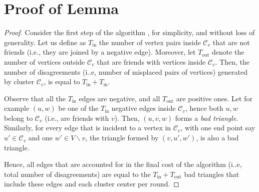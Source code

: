 \documentclass{article} %
\newcommand{\Cv}{\mathcal{C}_v}
\newcommand{\Tb}{\mathcal{T}_b}
\begin{document}
%


\section{Proof of Lemma}
\begin{proof}
Consider the first step of the algorithm , for simplicity, and without loss of generality.
Let us define as $T_{\text{in}}$ the  number of vertex pairs inside $\mathcal{C}_v$ that are not friends (i.e., they are joined by a negative edge).
Moreover, let $T_{\text{out}}$ denote the number of vertices outside $\mathcal{C}_v$ that are friends with vertices inside $\mathcal{C}_v$.
Then, the number of disagreements (i..e, number of misplaced pairs of vertices) generated by cluster $\mathcal{C}_v$, is equal to $T_{\text{in}}+T_{\text{in}}$.

Observe that all the $T_{\text{in}}$ edges are negative, and all $T_{\text{out}}$ are positive ones.
Let for example $(u,w)$ be one of the $T_{\text{in}}$ negative edges inside $\Cv$, hence both $u,w$ belong to $\Cv$ (i.e., are friends with $v$).
Then, $(u,v,w)$ forms a {\it bad triangle}.
Similarly, for every edge that is incident to a vertex in $\Cv$, with one end point say $u'\in \Cv$ and one $w'\in V\backslash v$, the triangle formed by $(v,u',w')$, is also a bad triangle.

Hence, all edges that are accounted for in the final cost of the algorithm (i..e, total number of disagreements) are equal to the $T_{\text{in}}+T_{\text{out}}$ bad triangles that include these edges and each cluster center per round.
\end{proof}
\end{document}
